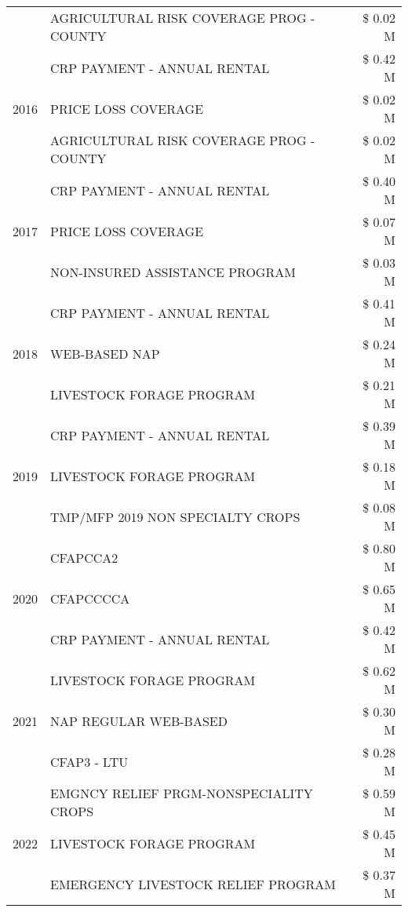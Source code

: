 \begin{tabular}{llr}
 & AGRICULTURAL RISK COVERAGE PROG - COUNTY & \$ 0.02 M \\
\cline{1-3}
\multirow[t]{3}{*}{2016} & CRP PAYMENT - ANNUAL RENTAL & \$ 0.42 M \\
 & PRICE LOSS COVERAGE & \$ 0.02 M \\
 & AGRICULTURAL RISK COVERAGE PROG - COUNTY & \$ 0.02 M \\
\cline{1-3}
\multirow[t]{3}{*}{2017} & CRP PAYMENT - ANNUAL RENTAL & \$ 0.40 M \\
 & PRICE LOSS COVERAGE & \$ 0.07 M \\
 & NON-INSURED ASSISTANCE PROGRAM & \$ 0.03 M \\
\cline{1-3}
\multirow[t]{3}{*}{2018} & CRP PAYMENT - ANNUAL RENTAL & \$ 0.41 M \\
 & WEB-BASED NAP & \$ 0.24 M \\
 & LIVESTOCK FORAGE PROGRAM & \$ 0.21 M \\
\cline{1-3}
\multirow[t]{3}{*}{2019} & CRP PAYMENT - ANNUAL RENTAL & \$ 0.39 M \\
 & LIVESTOCK FORAGE PROGRAM & \$ 0.18 M \\
 & TMP/MFP 2019 NON SPECIALTY CROPS & \$ 0.08 M \\
\cline{1-3}
\multirow[t]{3}{*}{2020} & CFAPCCA2 & \$ 0.80 M \\
 & CFAPCCCCA & \$ 0.65 M \\
 & CRP PAYMENT - ANNUAL RENTAL & \$ 0.42 M \\
\cline{1-3}
\multirow[t]{3}{*}{2021} & LIVESTOCK FORAGE PROGRAM & \$ 0.62 M \\
 & NAP REGULAR WEB-BASED & \$ 0.30 M \\
 & CFAP3 - LTU & \$ 0.28 M \\
\cline{1-3}
\multirow[t]{3}{*}{2022} & EMGNCY RELIEF PRGM-NONSPECIALITY CROPS & \$ 0.59 M \\
 & LIVESTOCK FORAGE PROGRAM & \$ 0.45 M \\
 & EMERGENCY LIVESTOCK RELIEF PROGRAM & \$ 0.37 M \\
\cline{1-3}
\bottomrule
\end{tabular}
